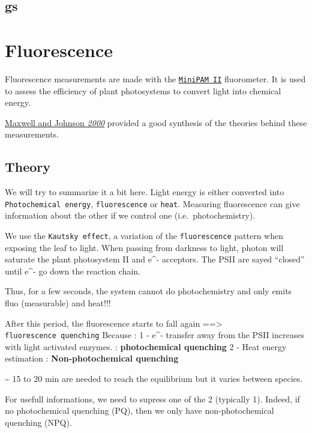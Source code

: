 \documentclass[
  12pt,
  american,
  a4paper,
  extrafontsizes,onecolumn,openright
  ]{memoir}
\begin{document}
\hypertarget{gs}{%
\section{gs}\label{gs}}

\hypertarget{fluorescence}{%
\chapter{Fluorescence}\label{fluorescence}}

Fluorescence measurements are made with the \href{document/machine/MiniPAM\%20II/minipamexp.pdf}{\texttt{MiniPAM\ II}} fluorometer.
It is used to assess the efficiency of plant photosystems to convert light into chemical energy.

\href{document/trait/fluorescence/Maxwell\%20and\%20Johnson\%20-\%202000\%20-\%20Chlorophyll\%20fluorescence—a\%20practical\%20guide.pdf}{Maxwell and Johnson \emph{2000}} provided a good synthesis of the theories behind these measurements.

\hypertarget{theory}{%
\section{Theory}\label{theory}}

We will try to summarize it a bit here.
Light energy is either converted into \texttt{Photochemical\ energy}, \texttt{fluorescence} or \texttt{heat}.
Measuring fluorescence can give information about the other if we control one (i.e.~photochemistry).

We use the \texttt{Kautsky\ effect}, a variation of the \texttt{fluorescence} pattern when exposing the leaf to light.
When passing from darkness to light, photon will saturate the plant photosystem II and e\^{}- acceptors.
The PSII are sayed \enquote{closed} until e\^{}- go down the reaction chain.

Thus, for a few seconds, the system cannot do photochemistry and only emits fluo (measurable) and heat!!!

After this period, the fluorescence starts to fall again ==\textgreater{} \texttt{fluorescence\ quenching}
Because : 1 - e\^{}- transfer away from the PSII increases with light activated enzymes. : \textbf{photochemical quenching}
2 - Heat energy estimation : \textbf{Non-photochemical quenching}

\textasciitilde{} 15 to 20 min are needed to reach the equilibrium but it varies between species.

For usefull informations, we need to supress one of the 2 (typically 1).
Indeed, if no photochemical quenching (PQ), then we only have non-photochemical quenching (NPQ).
\end{document}
